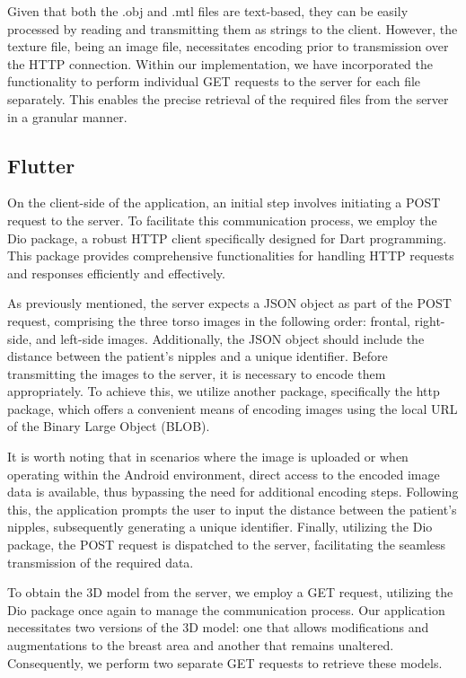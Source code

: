 Given that both the .obj and .mtl files are text-based, they can be easily processed by reading and transmitting them as strings to the client. 
However, the texture file, being an image file, necessitates encoding prior to transmission over the HTTP connection. Within our implementation, 
we have incorporated the functionality to perform individual GET requests to the server for each file separately. This enables the 
precise retrieval of the required files from the server in a granular manner. 

\subsection{Flutter}

On the client-side of the application, an initial step involves initiating a POST request to the server. To facilitate this communication process, 
we employ the Dio package, a robust HTTP client specifically designed for Dart programming. This package provides comprehensive functionalities for 
handling HTTP requests and responses efficiently and effectively.

As previously mentioned, the server expects a JSON object as part of the POST request, comprising the three torso images in the following order: 
frontal, right-side, and left-side images. Additionally, the JSON object should include the distance between the patient's nipples and a unique identifier. 
Before transmitting the images to the server, it is necessary to encode them appropriately. To achieve this, we utilize another package, 
specifically the http package, which offers a convenient means of encoding images using the local URL of the Binary Large Object (BLOB).

It is worth noting that in scenarios where the image is uploaded or when operating within the Android environment, 
direct access to the encoded image data is available, thus bypassing the need for additional encoding steps. Following this, 
the application prompts the user to input the distance between the patient's nipples, subsequently generating a unique identifier. Finally, 
utilizing the Dio package, the POST request is dispatched to the server, facilitating the seamless transmission of the required data.

To obtain the 3D model from the server, we employ a GET request, utilizing the Dio package once again to manage the communication process. 
Our application necessitates two versions of the 3D model: one that allows modifications and augmentations to the breast area and another 
that remains unaltered. Consequently, we perform two separate GET requests to retrieve these models.

